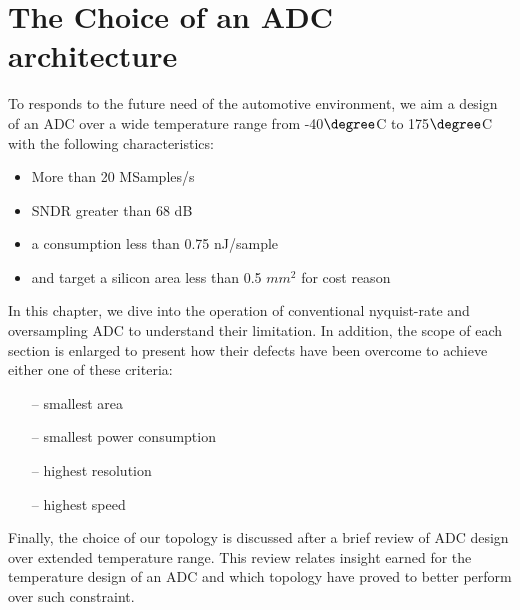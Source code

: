 \chapter{The Choice of an ADC architecture}
\label{sec:soa}
\ifpdf
    \graphicspath{{Chapter3/Figs/Raster/}{Chapter3/Figs/PDF/}{Chapter3/Figs/}}
\else
    \graphicspath{{Chapter3/Figs/Vector/}{Chapter3/Figs/}}
\fi

To responds to the future need of the automotive environment, we aim a design of an ADC over a wide temperature range from -40\(\degree \)C to 175\(\degree \)C with the following characteristics:

\begin{itemize}
\item More than 20 MSamples/s
\item SNDR greater than 68 dB
\item a consumption less than 0.75 nJ/sample
\item and target a silicon area less than 0.5 \(mm^2 \) for cost reason
\end{itemize}


In this chapter, we dive into the operation of conventional nyquist-rate and oversampling ADC to understand their limitation. In addition, the scope of each section is enlarged to present how their defects have been overcome to achieve either one of these criteria:
\begin{itemize}
\item[--] smallest area
\item[--] smallest power consumption
\item[--] highest resolution
\item[--] highest speed
\end{itemize}

Finally, the choice of our topology is discussed after a brief review of ADC design over extended temperature range. This review relates insight earned for the temperature design of an ADC and which topology have proved to better perform over such constraint.

